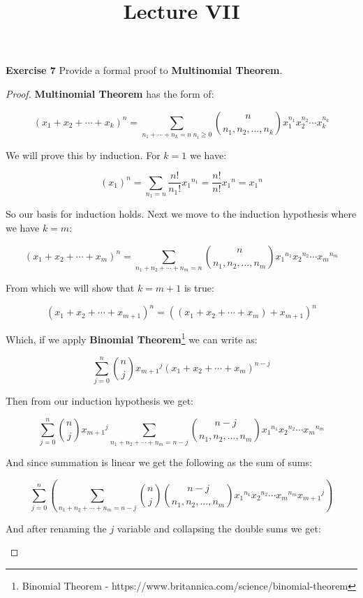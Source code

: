 \documentclass[a4paper]{article}
\title{\vspace{-2cm}Lecture VII\vspace{-2cm}}
\date{}
\begin{document}
\maketitle
\noindent \textbf{Exercise 7}  Provide a formal proof to \textbf{Multinomial Theorem}.
\begin{proof}
\textbf{Multinomial Theorem} has the form of:
\begin{center}
$$(x_1 + x_2 + \cdots + x_k)^n = \sum_{n_1+\cdots +n_k = n\ n_i \geq 0}^{} \binom{n}{n_1, n_2, ..., n_k}x_{1}^{n_{1}}x_{2}^{n_{2}}\cdots x_{k}^{n_{k}}$$
\end{center}
We will prove this by induction. For $k=1$ we have:
\begin{center}
$$(x_1)^n = \sum_{n_1 = n} \frac{n!}{n_1!} {x_1}^{n_1} =  \frac{n!}{n!} {x_1}^{n} = {x_1}^{n}$$
\end{center}
So our basis for induction holds. Next we move to the induction hypothesis where we have $k=m$:
\begin{center}
$$(x_1 + x_2 + \cdots + x_m)^n = \sum_{n_1 + n_2 + \cdots \mathop + n_m = n} \binom{n}{n_1, n_2, ..., n_m} {x_1}^{n_1} {x_2}^{n_2} \cdots {x_m}^{n_m}$$
\end{center}
From which we will show that $k=m+1$ is true:
\begin{center}
$$(x_1 + x_2 + \cdots + x_{m+1})^n = ((x_1 + x_2 + \cdots + x_m) + x_{m+1})^n$$
\end{center}
Which, if we apply \textbf{Binomial Theorem}\footnote{Binomial Theorem - https://www.britannica.com/science/binomial-theorem} we can write as:
\begin{center}
$$\sum_{j = 0}^{n} \binom{n}{j} {x_{m+ 1} }^j (x_1 + x_2 + \cdots + x_m)^{n - j}$$
\end{center}
Then from our induction hypothesis we get:
\begin{center}
$$\sum_{j = 0}^{n} \binom{n}{j} {x_{m + 1} }^j \sum_{n_1 + n_2 + \cdots + n_m = n - j} \binom{n - j}{n_1, n_2, ..., n_m} {x_1}^{n_1} {x_2}^{n_2} \cdots {x_m}^{n_m}$$
\end{center}
And since summation is linear we get the following as the sum of sums:
\begin{center}
$$\sum_{j = 0}^{n} \left(\sum_{n_1 + n_2 + \cdots + n_m = n - j} \binom{n}{j} \binom{n - j}{n_1, n_2, ..., n_m} {x_1}^{n_1} {x_2}^{n_2} \cdots {x_m}^{n_m} {x_{m + 1} }^j \right)$$
\end{center}
And after renaming the $j$ variable and collapsing the double sums we get:
\begin{center}

\end{center}
\end{proof}
\end{document}
